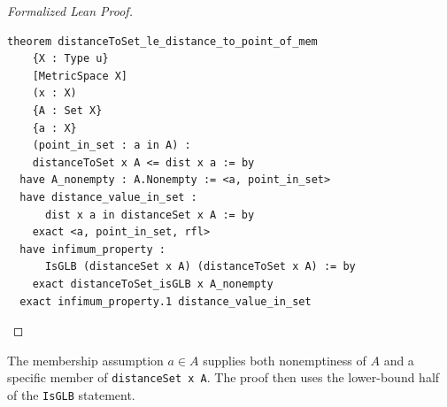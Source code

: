 \begin{proof}[Formalized Lean Proof]
\begin{verbatim}
theorem distanceToSet_le_distance_to_point_of_mem
    {X : Type u}
    [MetricSpace X]
    (x : X)
    {A : Set X}
    {a : X}
    (point_in_set : a in A) :
    distanceToSet x A <= dist x a := by
  have A_nonempty : A.Nonempty := <a, point_in_set>
  have distance_value_in_set :
      dist x a in distanceSet x A := by
    exact <a, point_in_set, rfl>
  have infimum_property :
      IsGLB (distanceSet x A) (distanceToSet x A) := by
    exact distanceToSet_isGLB x A_nonempty
  exact infimum_property.1 distance_value_in_set
\end{verbatim}
\end{proof}

\begin{remark*}
The membership assumption \(a\in A\) supplies both nonemptiness of \(A\) and a
specific member of \texttt{distanceSet x A}. The proof then uses the
lower-bound half of the \texttt{IsGLB} statement.
\end{remark*}

\NoLocalDependencies

\clearpage
